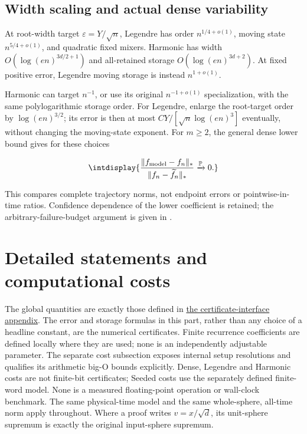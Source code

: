 \subsection{Width scaling and actual dense variability}



At root-width target \(\varepsilon=Y/\sqrt n\), Legendre has order \(n^{1/4+o(1)}\), moving state \(n^{5/4+o(1)}\), and quadratic fixed mixers. Harmonic has width \(O(\log(en)^{3d/2+1})\) and all-retained storage \(O(\log(en)^{3d+2})\). At fixed positive error, Legendre moving storage is instead \(n^{1+o(1)}\).



Harmonic can target \(n^{-1}\), or use its original \(n^{-1+o(1)}\) specialization, with the same polylogarithmic storage order. For Legendre, enlarge the root-target order by \(\log(en)^{3/2}\); its error is then at most \(CY/[\sqrt n\log(en)^3]\) eventually, without changing the moving-state exponent. For \(m\ge2\), the general dense lower bound gives for these choices


\begingroup\renewcommand{\theHequation}{intdisplay.33}
\begin{equation*}
\intdisplay{
\frac{\|f_{\rm model}-f_n\|_*}
{\|f_n-\widetilde f_n\|_*}\xrightarrow{\mathbb P}0.
}
\end{equation*}
\endgroup


This compares complete trajectory norms, not endpoint errors or pointwise-in-time ratios. Confidence dependence of the lower coefficient is retained; the arbitrary-failure-budget argument is given in .


\section{Detailed statements and computational costs}
\label{int:detailed-statements}


The global quantities are exactly those defined in \hyperref[int:headline-results]{the certificate-interface appendix}. The error and storage formulas in this part, rather than any choice of a headline constant, are the numerical certificates. Finite recurrence coefficients are defined locally where they are used; none is an independently adjustable parameter. The separate cost subsection exposes internal setup resolutions and qualifies its arithmetic big-O bounds explicitly. Dense, Legendre and Harmonic costs are not finite-bit certificates; Seeded costs use the separately defined finite-word model. None is a measured floating-point operation or wall-clock benchmark. The same physical-time model and the same whole-sphere, all-time norm apply throughout. Where a proof writes \(v=x/\sqrt d\), its unit-sphere supremum is exactly the original input-sphere supremum.


